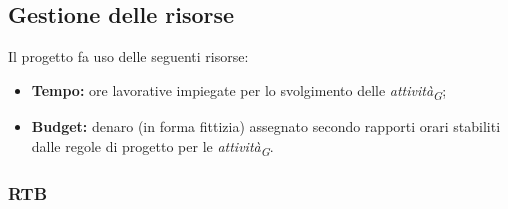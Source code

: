 \subsection{Gestione delle risorse}
Il progetto fa uso delle seguenti risorse:

\begin{itemize}
  \item \textbf{Tempo:} ore lavorative impiegate per lo svolgimento delle \textit{attività}\textsubscript{\textit{G}};
  \item \textbf{Budget:} denaro (in forma fittizia) assegnato secondo rapporti orari stabiliti dalle regole di progetto per le \textit{attività}\textsubscript{\textit{G}}.
\end{itemize}
\subsubsection{RTB}
